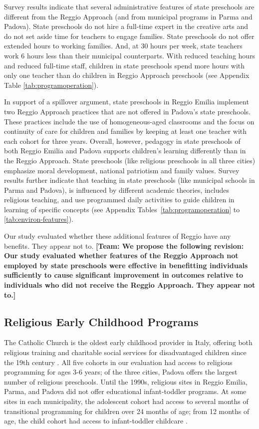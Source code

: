 Survey results indicate that several administrative features of state preschools are different from the Reggio Approach (and from municipal programs in Parma and Padova). State preschools do not hire a full-time expert in the creative arts and do not set aside time for teachers to engage families. State preschools do not offer extended hours to working families. And, at 30 hours per week, state teachers work 6 hours less than their municipal counterparts. With reduced teaching hours and reduced full-time staff, children in state preschools spend more hours with only one teacher than do children in Reggio Approach preschools (see Appendix Table \ref{tab:programoperation}). 

In support of a spillover argument, state preschools in Reggio Emilia implement two Reggio Approach practices that are not offered in Padova's state preschools. These practices include the use of homogeneous-aged classrooms and the focus on continuity of care for children and families by keeping at least one teacher with each cohort for three years. Overall, however, pedagogy in state preschools of both Reggio Emilia and Padova  supports children's learning differently than in the Reggio Approach. State preschools (like religious preschools in all three cities) emphasize moral development, national patriotism and family values. Survey results further indicate that teaching in state preschools (like municipal schools in Parma and Padova), is influenced by different academic theories, includes religious teaching, and use programmed daily activities to guide children in learning of specific concepts (see Appendix Tables~\ref{tab:programoperation} to \ref{tab:environ-features}). 

Our study evaluated whether these additional features of Reggio have any benefits. They appear not to. \textbf{[Team: We propose the following revision: Our study evaluated whether features of the Reggio Approach not employed by state preschools were effective in benefitting individuals sufficiently to cause significant improvement in outcomes relative to individuals who did not receive the Reggio Approach. They appear not to.]}

\subsection{Religious Early Childhood Programs}

The Catholic Church is the oldest early childhood provider in Italy, offering both religious training and charitable social services for disadvantaged children since the 19th century \citep{OECD_2001_Italy-Country-Note}. All five cohorts in our evaluation had access to religious programming for ages 3-6 years; of the three cities, Padova offers the largest number of religious preschools. Until the 1990s, religious sites in Reggio Emilia, Parma, and Padova did not offer educational infant-toddler programs. At some sites in each municipality, the adolescent cohort had access to several months of transitional programming for children over 24 months of age; from 12 months of age, the child cohort had access to infant-toddler childcare \citep{Malizia-Cicatelli_2011_BOOK_Catholic-School,CEHD_2016_Historical-Analysis}.

